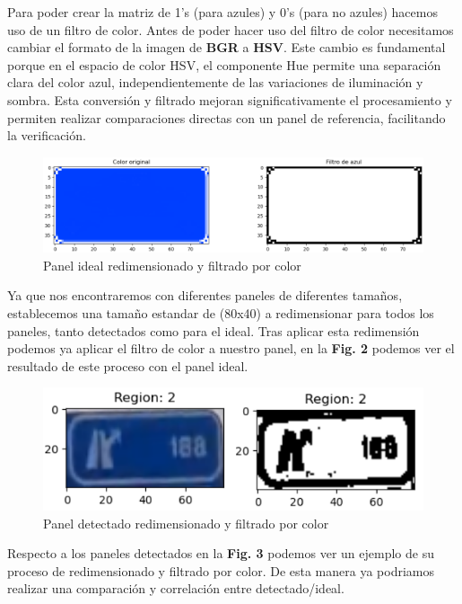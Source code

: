 \documentclass[a4paper, 12pt]{article}
\begin{document}
Para poder crear la matriz de 1's (para azules) y 0's (para no azules) hacemos uso de un filtro de color. Antes de poder hacer uso del filtro de color necesitamos cambiar el formato de la imagen de \textbf{BGR} a \textbf{HSV}. Este cambio es fundamental porque en el espacio de color HSV, el componente Hue permite una separación clara del color azul, independientemente de las variaciones de iluminación y sombra. Esta conversión y filtrado mejoran significativamente el procesamiento y permiten realizar comparaciones directas con un panel de referencia, facilitando la verificación.

\begin{figure}[h]
	\centering
	\includegraphics[width=0.9\linewidth]{img/ideal_mask_resized_and_filtered}
	\caption{Panel ideal redimensionado y filtrado por color}
	\label{fig:idealmaskresizedandfiltered}
\end{figure}

Ya que nos encontraremos con diferentes paneles de diferentes tamaños, establecemos una tamaño estandar de (80x40) a redimensionar para todos los paneles, tanto detectados como para el ideal. Tras aplicar esta redimensión podemos ya aplicar el filtro de color a nuestro panel, en la \textbf{Fig. 2} podemos ver el resultado de este proceso con el panel ideal.
\begin{figure}[h]
	\centering
	\includegraphics[width=0.7\linewidth]{img/sections}
	\caption{Panel detectado redimensionado y filtrado por color}
	\label{fig:sections}
\end{figure}

Respecto a los paneles detectados en la \textbf{Fig. 3} podemos ver un ejemplo de su proceso de redimensionado y filtrado por color. De esta manera ya podriamos realizar una comparación y correlación entre detectado/ideal.
\end{document}
